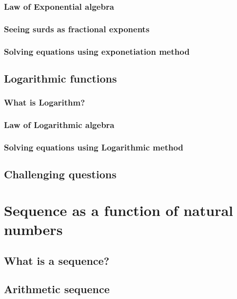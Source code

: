 \documentclass[12pt]{article}
\begin{document}
    \subsubsection{Law of Exponential algebra}

    \subsubsection{Seeing surds as fractional exponents}

    \subsubsection{Solving equations using exponetiation method}

    \subsection{Logarithmic functions}

    \subsubsection{What is Logarithm?}

    \subsubsection{Law of Logarithmic algebra}

    \subsubsection{Solving equations using Logarithmic method}

    \subsection{Challenging questions}

    \newpage

    \section{Sequence as a function of natural numbers}

    \subsection{What is a sequence?}

    \subsection{Arithmetic sequence}
\end{document}
